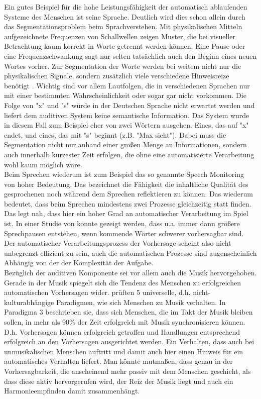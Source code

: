 \documentclass[doc,a4paper,12pt]{apa6}
\begin{document}
Ein gutes Beispiel für die hohe Leistungsfähigkeit der automatisch ablaufenden Systeme des Menschen ist seine Sprache. Deutlich wird dies schon allein durch das Segmentationsproblem beim Sprachverstehen. Mit physikalischen Mitteln aufgezeichnete Frequenzen von Schallwellen zeigen Muster, die bei visueller Betrachtung kaum korrekt in Worte getrennt werden können. Eine Pause oder eine Frequenzschwankung sagt nur selten tatsächlich auch den Beginn eines neuen Wortes vorher. Zur Segmentation der Worte werden bei weitem nicht nur die physikalischen Signale, sondern zusätzlich viele verschiedene Hinweisreize benötigt \parencites[u.a.][]{brent1996distributional}{saffran1996word}. Wichtig sind vor allem Lautfolgen, die in verschiedenen Sprachen nur mit einer bestimmten Wahrscheinlichkeit oder sogar gar nicht vorkommen. Die Folge von "x" und "s" würde in der Deutschen Sprache nicht erwartet werden und liefert dem auditiven System keine semantische Information. Das System wurde in diesem Fall zum Beispiel eher von zwei Wörtern ausgehen. Eines, das auf "x" endet, und eines, das mit "s" beginnt (z.B. "Max sieht"). Dabei muss die Segmentation nicht nur anhand einer großen Menge an Informationen, sondern auch innerhalb kürzester Zeit erfolgen, die ohne eine automatisierte Verarbeitung wohl kaum möglich wäre.\\
Beim Sprechen wiederum ist zum Beispiel das so genannte Speech Monitoring \parencites{levelt1983monitoring}{postma2000detection} von hoher Bedeutung. Das bezeichnet die Fähigkeit die inhaltliche Qualität des gesprochenen noch während dem Sprechen reflektieren zu können. Das wiederum bedeutet, dass beim Sprechen mindestens zwei Prozesse gleichzeitig statt finden. Das legt nah, dass hier ein hoher Grad an automatischer Verarbeitung im Spiel ist. In einer Studie von \textcite{goldman1958speech} konnte gezeigt werden, dass u.a. immer dann größere Sprechpausen entstehen, wenn kommende Wörter schwerer vorhersagbar sind. Der automatischer Verarbeitungsprozess der Vorhersage scheint also nicht unbegrenzt effizient zu sein, auch die automatischen Prozesse sind augenscheinlich Abhängig von der der Komplexität der Aufgabe.\\
Bezüglich der auditiven Komponente sei vor allem auch die Musik hervorgehoben. Gerade in der Musik spiegelt sich die Tendenz des Menschen zu erfolgreichen automatischen Vorhersagen wider. \textcite{drake2001quest} prüften 5 universelle, d.h. nicht-kulturabhängige Paradigmen, wie sich Menschen zu Musik verhalten. In Paradigma 3 beschrieben sie, dass sich Menschen, die im Takt der Musik bleiben sollen, in mehr als 90\% der Zeit erfolgreich mit Musik synchronisieren können. D.h. Vorhersagen können erfolgreich getroffen und Handlungen entsprechend erfolgreich an den Vorhersagen ausgerichtet werden. Ein Verhalten, dass auch bei unmusikalischen Menschen auftritt und damit auch hier einen Hinweis für ein automatisches Verhalten liefert. Man könnte mutmaßen, dass genau in der Vorhersagbarkeit, die anscheinend mehr passiv mit dem Menschen geschieht, als dass diese aktiv hervorgerufen wird, der Reiz der Musik liegt und auch ein Harmonieempfinden damit zusammenhängt.
\end{document}
